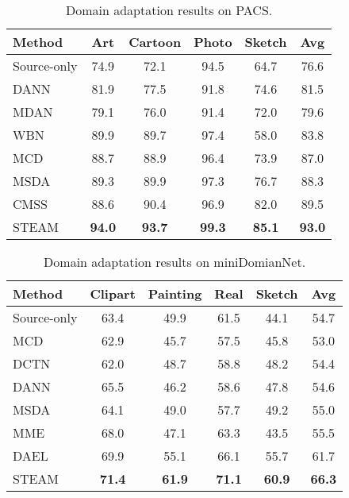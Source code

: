 \documentclass[10pt,twocolumn,letterpaper]{article}
\newcommand{\0}{{\bf 0}}
\begin{document}
\begin{table}[t]
\center
\footnotesize
\renewcommand{\arraystretch}{1.1}
\caption{Domain adaptation results on PACS.}
\vspace{0.2cm}
\begin{tabular}{l | c c c c | c}
\hline
Method & Art & Cartoon & Photo & Sketch & Avg \\
\hline
Source-only & 74.9 & 72.1 & 94.5 & 64.7 & 76.6 \\
DANN \cite{ganin2015unsupervised} & 81.9 & 77.5 & 91.8 & 74.6 & 81.5 \\
MDAN \cite{zhao2018adversarial} &79.1 & 76.0 & 91.4 & 72.0 & 79.6 \\
WBN \cite{mancini2018boosting} & 89.9 & 89.7 & 97.4 & 58.0 & 83.8 \\
MCD \cite{saito2018maximum} &88.7 & 88.9 & 96.4 & 73.9 & 87.0 \\
MSDA \cite{peng2019moment} & 89.3 & 89.9 & 97.3 &76.7 & 88.3 \\
CMSS \cite{yang2020curriculum} & 88.6 & 90.4 & 96.9 & 82.0 & 89.5 \\
\hline
STEAM & \textbf{94.0} & \textbf{93.7} & \textbf{99.3} & \textbf{85.1} & \textbf{93.0} \\
\hline
\end{tabular}
\vspace{-0.1in}
\label{tab:pacs-da}
\end{table}

\begin{table}[t]
\center
\footnotesize
\renewcommand{\arraystretch}{1.1}
\caption{Domain adaptation results on miniDomianNet.}
\vspace{0.2cm}
\begin{tabular}{l | c c c c | c}
\hline
Method & Clipart & Painting & Real & Sketch & Avg \\
\hline
Source-only & 63.4 & 49.9 & 61.5 & 44.1 & 54.7 \\
MCD \cite{saito2018maximum} & 62.9 & 45.7 & 57.5 & 45.8 & 53.0 \\
DCTN~\cite{xu2018deep} &62.0 & 48.7 & 58.8 & 48.2 & 54.4 \\
DANN \cite{ganin2015unsupervised} & 65.5 & 46.2 & 58.6 & 47.8 & 54.6 \\
MSDA \cite{peng2019moment} & 64.1 & 49.0 & 57.7 & 49.2 & 55.0 \\
MME \cite{saito2019semi} & 68.0 & 47.1 & 63.3 & 43.5 & 55.5\\
DAEL \cite{zhou2020domain} & 69.9 & 55.1 & 66.1 &55.7 & 61.7 \\
\hline
STEAM & \textbf{71.4} & \textbf{61.9} & \textbf{71.1} & \textbf{60.9} & \textbf{66.3} \\
\hline
\end{tabular}
\vspace{-0.4cm}
\label{tab:minidomainnet-da}
\end{table}
\end{document}
